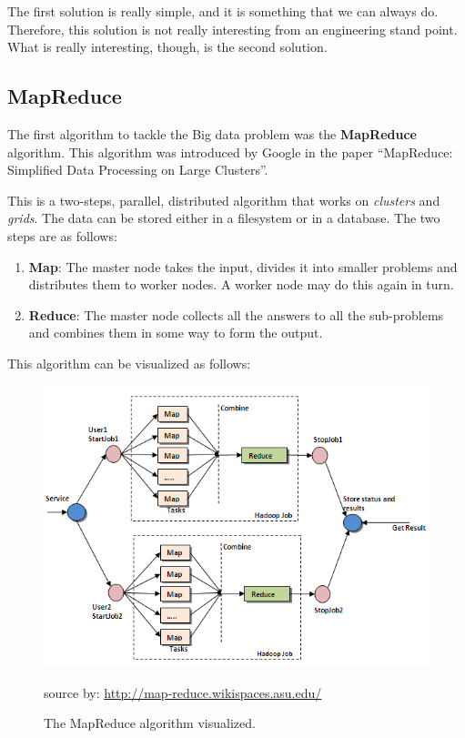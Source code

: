 The first solution is really simple, and it is something that we can always do.
Therefore, this solution is not really interesting from an engineering stand
point. What is really interesting, though, is the second solution.

\subsection{MapReduce}

The first algorithm to tackle the Big data problem was the {\bf MapReduce}
algorithm. This algorithm was introduced by Google in the paper ``MapReduce:
Simplified Data Processing on Large Clusters''\cite{google}.

This is a two-steps, parallel, distributed algorithm that works on {\it
clusters} and {\it grids}. The data can be stored either in a filesystem or in a
database. The two steps are as follows:

\begin{enumerate}
  \itemsep0em
  \item {\bf Map}: The master node takes the input, divides it into smaller
problems and distributes them to worker nodes. A worker node may do this again
in turn.
  \item {\bf Reduce}: The master node collects all the answers to all the
sub-problems and combines them in some way to form the output.
\end{enumerate}

This algorithm can be visualized as follows:

\begin{figure}[H]
  \centering
  \includegraphics[scale=0.8]{overview/images/mapreduce.png}
  \caption{The MapReduce algorithm visualized.}\label{fig:a}
  \small source
by: \url{http://map-reduce.wikispaces.asu.edu/}
\end{figure}

